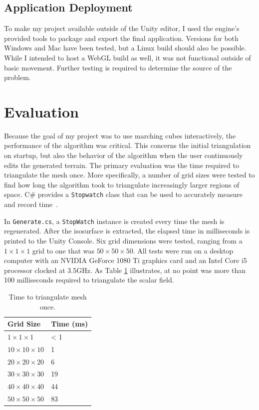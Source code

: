 \documentclass[pageno]{jpaper}
\begin{document}
\subsection{Application Deployment}

To make my project available outside of the Unity editor, I used the engine's provided tools to package and export the final application. Versions for both Windows and Mac have been tested, but a Linux build should also be possible. While I intended to host a WebGL build as well, it was not functional outside of basic movement. Further testing is required to determine the source of the problem.

\section{Evaluation}

Because the goal of my project was to use marching cubes interactively, the performance of the algorithm was critical. This concerns the initial triangulation on startup, but also the behavior of the algorithm when the user continuously edits the generated terrain. The primary evaluation was the time required to triangulate the mesh once. More specifically, a number of grid sizes were tested to find how long the algorithm took to triangulate increasingly larger regions of space. C\# provides a \texttt{Stopwatch} class that can be used to accurately measure and record time~\cite{stopwatch}.

In \texttt{Generate.cs}, a \texttt{StopWatch} instance is created every time the mesh is regenerated. After the isosurface is extracted, the elapsed time in milliseconds is printed to the Unity Console. Six grid dimensions were tested, ranging from a $1\times1\times1$ grid to one that was $50\times50\times50$. All tests were run on a desktop computer with an NVIDIA GeForce 1080 Ti graphics card and an Intel Core i5 processor clocked at 3.5GHz. As Table \ref{table:times} illustrates, at no point was more than 100 milliseconds required to triangulate the scalar field.

\begin{table}[hbt]
\centering
\begin{tabular}{|l|l|}
\hline
\textbf{Grid Size} & \textbf{Time (ms)}\\
\hline
\hline
$1\times1\times1$ & < 1\\
\hline
$10\times10\times10$ & 1\\
\hline
$20\times20\times20$ & 6\\
\hline
$30\times30\times30$ & 19\\
\hline
$40\times40\times40$ & 44\\
\hline
$50\times50\times50$ & 83\\
\hline
\end{tabular}
\caption{Time to triangulate mesh once.}
\label{table:times}
\end{table}
\end{document}
